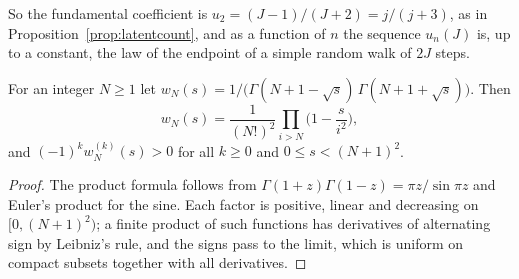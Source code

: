 So the fundamental coefficient is $u_2=(J-1)/(J+2)=j/(j+3)$, as in Proposition~\ref{prop:latentcount}, and as a function of $n$ the sequence $u_n(J)$ is, up to a constant, the law of the endpoint of a simple random walk of $2J$ steps.

\begin{lemma}\label{lem:cm}
For an integer $N\ge1$ let $w_N(s)=1\big/\big(\Gamma(N+1-\sqrt s)\,\Gamma(N+1+\sqrt s)\big)$. Then
\[
w_N(s)=\frac1{(N!)^2}\prod_{i>N}\Big(1-\frac s{i^2}\Big),
\]
and $(-1)^kw_N^{(k)}(s)>0$ for all $k\ge0$ and $0\le s<(N+1)^2$.
\end{lemma}

\begin{proof}
The product formula follows from $\Gamma(1+z)\Gamma(1-z)=\pi z/\sin\pi z$ and Euler's product for the sine. Each factor is positive, linear and decreasing on $[0,(N+1)^2)$; a finite product of such functions has derivatives of alternating sign by Leibniz's rule, and the signs pass to the limit, which is uniform on compact subsets together with all derivatives.
\end{proof}

